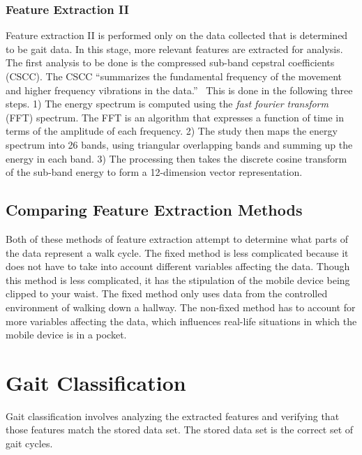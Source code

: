 \documentclass{sig-alternate}
\begin{document}
\subsubsection{Feature Extraction II}{
	Feature extraction II is performed only on the data collected that is determined to be gait data. In this stage, more relevant features are extracted for analysis. The first analysis to be done is the compressed sub-band cepstral coefficients (CSCC). The CSCC ``summarizes the fundamental frequency of the movement and higher frequency vibrations in the data.''~\cite{Lu:2014} This is done in the following three steps. 1) The energy spectrum is computed using the \textit{fast fourier transform} (FFT) spectrum. The FFT is an algorithm that expresses a function of time in terms of the amplitude of each frequency. 2) The study then maps the energy spectrum into 26 bands, using triangular overlapping bands and summing up the energy in each band. 3) The processing then takes the discrete cosine transform of the sub-band energy to form a 12-dimension vector representation.
}
\subsection{Comparing Feature Extraction Methods}
	Both of these methods of feature extraction attempt to determine what parts of the data represent a walk cycle. The fixed method is less complicated because it does not have to take into account different variables affecting the data. Though this method is less complicated, it has the stipulation of the mobile device being clipped to your waist. The fixed method only uses data from the controlled environment of walking down a hallway. The non-fixed method has to account for more variables affecting the data, which influences real-life situations in which the mobile device is in a pocket.
	
\section{Gait Classification}
	Gait classification involves analyzing the extracted features and verifying that those features match the stored data set. The stored data set is the correct set of gait cycles. 
\end{document}
